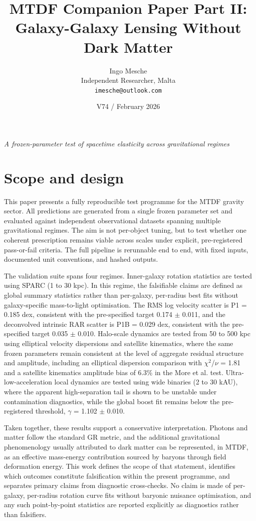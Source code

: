 \documentclass[11pt,a4paper]{article}
\title{MTDF Companion Paper Part II: Galaxy-Galaxy Lensing Without Dark Matter}
\author{Ingo Mesche\\ \small Independent Researcher, Malta \\ \small \texttt{imesche@outlook.com}}
\date{V74 / February 2026}
\begin{document}
\maketitle
\begin{center}\itshape A frozen-parameter test of spacetime elasticity across gravitational regimes\end{center}



\tableofcontents

\section{Scope and design}
\label{sec:scope}
This paper presents a fully reproducible test programme for the MTDF gravity sector. All predictions are generated from a single frozen parameter set and evaluated against independent observational datasets spanning multiple gravitational regimes. The aim is not per-object tuning, but to test whether one coherent prescription remains viable across scales under explicit, pre-registered pass-or-fail criteria. The full pipeline is rerunnable end to end, with fixed inputs, documented unit conventions, and hashed outputs.

The validation suite spans four regimes. Inner-galaxy rotation statistics are tested using SPARC (1 to 30 kpc). In this regime, the falsifiable claims are defined as global summary statistics rather than per-galaxy, per-radius best fits without galaxy-specific mass-to-light optimisation. The RMS log velocity scatter is P1 = 0.185 dex, consistent with the pre-specified target 0.174 $\pm$ 0.011, and the deconvolved intrinsic RAR scatter is P1B = 0.029 dex, consistent with the pre-specified target 0.035 $\pm$ 0.010. Halo-scale dynamics are tested from 50 to 500 kpc using elliptical velocity dispersions and satellite kinematics, where the same frozen parameters remain consistent at the level of aggregate residual structure and amplitude, including an elliptical dispersion comparison with $\chi$$^{2}$/$\nu$ = 1.81 and a satellite kinematics amplitude bias of 6.3\% in the More et al. test. Ultra-low-acceleration local dynamics are tested using wide binaries (2 to 30 kAU), where the apparent high-separation tail is shown to be unstable under contamination diagnostics, while the global boost fit remains below the pre-registered threshold, $\gamma$ = 1.102 $\pm$ 0.010.

Taken together, these results support a conservative interpretation. Photons and matter follow the standard GR metric, and the additional gravitational phenomenology usually attributed to dark matter can be represented, in MTDF, as an effective mass-energy contribution sourced by baryons through field deformation energy. This work defines the scope of that statement, identifies which outcomes constitute falsification within the present programme, and separates primary claims from diagnostic cross-checks. No claim is made of per-galaxy, per-radius rotation curve fits without baryonic nuisance optimisation, and any such point-by-point statistics are reported explicitly as diagnostics rather than falsifiers.
\end{document}
